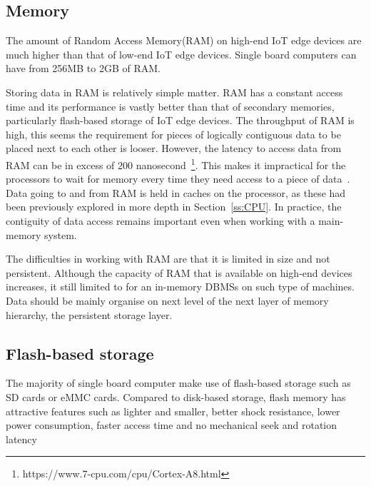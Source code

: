 \subsection{Memory}

The amount of Random Access Memory(RAM) on high-end IoT edge devices are much higher than that of low-end IoT edge devices.
Single board computers can have from 256MB to 2GB of RAM.

Storing data in RAM is relatively simple matter.
RAM has a constant access time and its performance is vastly better than that of secondary memories, particularly flash-based storage of IoT edge devices. 
The throughput of RAM is high, this seems the requirement for pieces of logically contiguous data to be placed next to each other is looser.
However, the latency to access data from RAM can be in excess of 200 nanosecond~\footnote{https://www.7-cpu.com/cpu/Cortex-A8.html}.
This makes it impractical for the processors to wait for memory every time they need access to a piece of data~\citep{Drepper:2007}.
Data going to and from RAM is held in caches on the processor, as these had been previously explored in more depth in Section~\ref{ss:CPU}.
In practice, the contiguity of data access remains important even when working with a main-memory system.

The difficulties in working with RAM are that it is limited in size and not persistent.
Although the capacity of RAM that is available on high-end devices increases, it still limited to for an in-memory DBMSs on such type of machines.
Data should be mainly organise on next level of the next layer of memory hierarchy, the persistent storage layer.

\subsection{Flash-based storage}
\label{ss:flash}

The majority of single board computer make use of flash-based storage such as SD cards or eMMC cards. 
Compared to disk-based storage, flash memory has attractive features such as lighter and smaller, better shock resistance, lower power consumption, faster access time and no mechanical seek and rotation latency~\citep{Koltsidas:2011}

